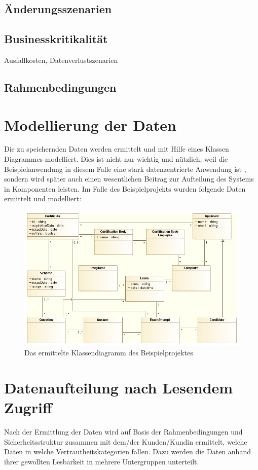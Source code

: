 \subsection{Änderungsszenarien}
\subsection{Businesskritikalität}
Ausfallkosten, Datenverlustszenarien
\subsection{Rahmenbedingungen}

\section{Modellierung der Daten}
Die zu speichernden Daten werden ermittelt und mit Hilfe eines Klassen Diagrammes modelliert. Dies ist nicht nur wichtig und nützlich, weil die Beispielanwendung in diesem Falle eine stark datenzentrierte Anwendung ist \cite[S. 105]{effektiv}, sondern wird später auch einen wesentlichen Beitrag zur Aufteilung des Systems in Komponenten leisten. Im Falle des Beispielprojekts wurden folgende Daten ermittelt und modelliert:

\begin{figure}[!htbp]
    \centering
    \includegraphics[scale=0.5]{uml/class.png}
    \caption{Das ermittelte Klassendiagramm des Beispielprojektes}
\end{figure}

\section{Datenaufteilung nach Lesendem Zugriff}
Nach der Ermittlung der Daten wird auf Basis der Rahmenbedingungen und Sicherheitsstruktur zusammen mit dem/der Kunden/Kundin ermittelt, welche Daten in welche Vertrautheitskategorien fallen. Dazu werden die Daten anhand ihrer gewollten Lesbarkeit in mehrere Untergruppen unterteilt.

